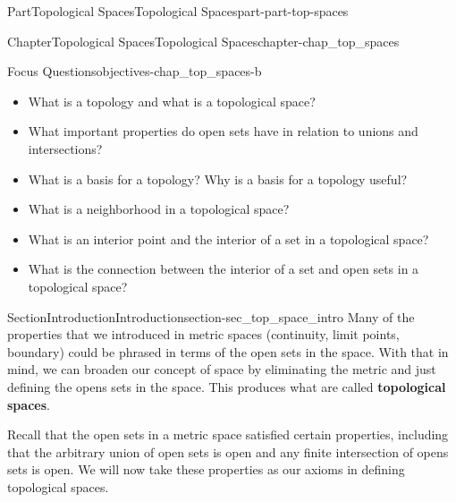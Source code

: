 \documentclass[oneside,10pt,]{book}
\newcommand{\terminology}[1]{\textbf{#1}}
\numberwithin{equation}{chapter}
\begin{document}
%
%
\typeout{************************************************}
\typeout{************************************************}
%
\begin{partptx}{Part}{Topological Spaces}{}{Topological Spaces}{}{}{part-part-top-spaces}
\renewcommand*{\partname}{Part}
%
\typeout{************************************************}
\typeout{************************************************}
%
\begin{chapterptx}{Chapter}{Topological Spaces}{}{Topological Spaces}{}{}{chapter-chap_top_spaces}
\renewcommand*{\chaptername}{Chapter}
\begin{objectives}{Focus Questions}{objectives-chap_top_spaces-b}
%
\begin{itemize}[label=\textbullet]
\item{}What is a topology and what is a topological space?%
\item{}What important properties do open sets have in relation to unions and intersections?%
\item{}What is a basis for a topology? Why is a basis for a topology useful?%
\item{}What is a neighborhood in a topological space?%
\item{}What is an interior point and the interior of a set in a topological space?%
\item{}What is the connection between the interior of a set and open sets in a topological space?%
\end{itemize}
\end{objectives}
%
%
\typeout{************************************************}
\typeout{************************************************}
%
\begin{sectionptx}{Section}{Introduction}{}{Introduction}{}{}{section-sec_top_space_intro}
Many of the properties that we introduced in metric spaces (continuity, limit points, boundary) could be phrased in terms of the open sets in the space. With that in mind, we can broaden our concept of space by eliminating the metric and just defining the opens sets in the space. This produces what are called \terminology{topological spaces}.%
\par
Recall that the open sets in a metric space satisfied certain properties, including that the arbitrary union of open sets is open and any finite intersection of opens sets is open. We will now take these properties as our axioms in defining topological spaces.%

\end{sectionptx}
\end{chapterptx}
\end{partptx}
\end{document}
